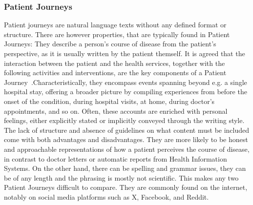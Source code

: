 \subsubsection*{Patient Journeys}\label{sec:pj}
Patient journeys are natural language texts without any defined format or structure. There are however properties, that are typically found in Patient Journeys: They describe a person's course of disease from the patient's perspective, as it is usually written by the patient themself. It is agreed that the interaction between the patient and the health services, together with the following activities and interventions, are the key components of a Patient Journey~\cite{ferrara_engaging_2019, kuo_rosacea_2015}.Characteristically, they encompass events spanning beyond e.g. a single hospital stay, offering a broader picture by compiling experiences from before the onset of the condition, during hospital visits, at home, during doctor's appointments, and so on. Often, these accounts are enriched with personal feelings, either explicitly stated or implicitly conveyed through the writing style. The lack of structure and absence of guidelines on what content must be included come with both advantages and disadvantages. They are more likely to be honest and approachable representations of how a patient perceives the course of disease, in contrast to doctor letters or automatic reports from Health Information Systems. On the other hand, there can be spelling and grammar issues, they can be of any length and the phrasing is mostly not scientific. This makes any two Patient Journeys difficult to compare. They are commonly found on the internet, notably on social media platforms such as X, Facebook, and Reddit.

